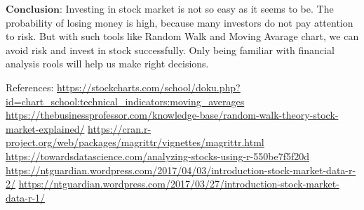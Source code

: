 \documentclass[]{article}
\begin{document}
\(\textbf{Conclusion:}\) Investing in stock market is not so easy as it
seems to be. The probability of losing money is high, because many
investors do not pay attention to risk. But with such tools like Random
Walk and Moving Avarage chart, we can avoid risk and invest in stock
successfully. Only being familiar with financial analysis rools will
help us make right decisions.

References:
\url{https://stockcharts.com/school/doku.php?id=chart_school:technical_indicators:moving_averages}
\url{https://thebusinessprofessor.com/knowledge-base/random-walk-theory-stock-market-explained/}
\url{https://cran.r-project.org/web/packages/magrittr/vignettes/magrittr.html}
\url{https://towardsdatascience.com/analyzing-stocks-using-r-550be7f5f20d}
\url{https://ntguardian.wordpress.com/2017/04/03/introduction-stock-market-data-r-2/}
\url{https://ntguardian.wordpress.com/2017/03/27/introduction-stock-market-data-r-1/}
\end{document}
